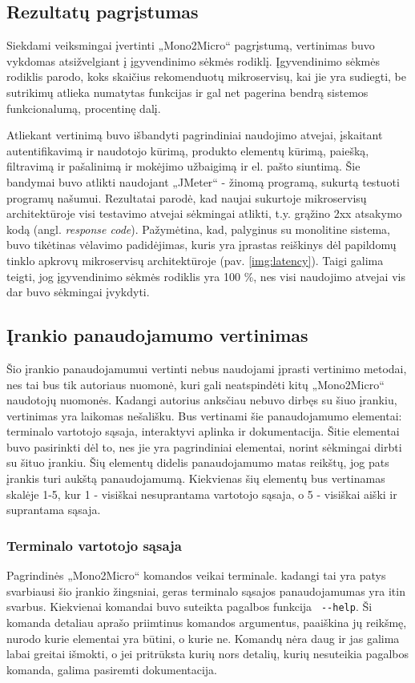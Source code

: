 \documentclass{VUMIFPSbakalaurinis}
\begin{document}
\subsection{Rezultatų pagrįstumas}
Siekdami veiksmingai įvertinti „Mono2Micro“ pagrįstumą, vertinimas buvo vykdomas atsižvelgiant į įgyvendinimo sėkmės rodiklį. Įgyvendinimo sėkmės rodiklis parodo, koks skaičius rekomenduotų mikroservisų, kai jie yra sudiegti, be sutrikimų atlieka numatytas funkcijas ir gal net pagerina bendrą sistemos funkcionalumą, procentinę dalį.

Atliekant vertinimą buvo išbandyti pagrindiniai naudojimo atvejai, įskaitant autentifikavimą ir naudotojo kūrimą, produkto elementų kūrimą, paiešką, filtravimą ir pašalinimą ir mokėjimo užbaigimą ir el. pašto siuntimą. Šie bandymai buvo atlikti naudojant „JMeter“ - žinomą programą, sukurtą testuoti programų našumui. Rezultatai parodė, kad naujai sukurtoje mikroservisų architektūroje visi testavimo atvejai sėkmingai atlikti, t.y. grąžino 2xx atsakymo kodą (angl. \emph{response code}). Pažymėtina, kad, palyginus su monolitine sistema, buvo tikėtinas vėlavimo padidėjimas, kuris yra įprastas reiškinys dėl papildomų tinklo apkrovų mikroservisų architektūroje (pav. \ref{img:latency}). Taigi galima teigti, jog įgyvendinimo sėkmės rodiklis yra 100 \%, nes visi naudojimo atvejai vis dar buvo sėkmingai įvykdyti.

\subsection{Įrankio panaudojamumo vertinimas}
Šio įrankio panaudojamumui vertinti nebus naudojami įprasti vertinimo metodai, nes tai bus tik autoriaus nuomonė, kuri gali neatspindėti kitų „Mono2Micro“ naudotojų nuomonės. Kadangi autorius anksčiau nebuvo dirbęs su šiuo įrankiu, vertinimas yra laikomas nešališku. Bus vertinami šie panaudojamumo elementai: terminalo vartotojo sąsaja, interaktyvi aplinka ir dokumentacija. Šitie elementai buvo pasirinkti dėl to, nes jie yra pagrindiniai elementai, norint sėkmingai dirbti su šituo įrankiu. Šių elementų didelis panaudojamumo matas reikštų, jog pats įrankis turi aukštą panaudojamumą. Kiekvienas šių elementų bus vertinamas skalėje 1-5, kur 1 - visiškai nesuprantama vartotojo sąsaja, o 5 - visiškai aiški ir suprantama sąsaja.

\subsubsection{Terminalo vartotojo sąsaja}
Pagrindinės „Mono2Micro“ komandos veikai terminale. kadangi tai yra patys svarbiausi šio įrankio žingsniai, geras terminalo sąsajos panaudojamumas yra itin svarbus. Kiekvienai komandai buvo suteikta pagalbos funkcija \verb| --help|. Ši komanda detaliau aprašo priimtinus komandos argumentus, paaiškina jų reikšmę, nurodo kurie elementai yra būtini, o kurie ne. Komandų nėra daug ir jas galima labai greitai išmokti, o jei pritrūksta kurių nors detalių, kurių nesuteikia pagalbos komanda, galima pasiremti dokumentacija.
\end{document}
